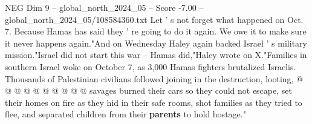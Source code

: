 \begin{textsample}{NEG Dim 9 – global\_north\_2024\_05 – Score -7.00 – global\_north\_2024\_05/108584360.txt}
Let ' s not forget what happened on Oct. 7.
Because Hamas has said they ' re going to do it again.
We owe it to make sure it never happens again."And on Wednesday Haley again backed Israel ' s military mission."Israel did not start this war -- Hamas did,"Haley wrote on X."Families in southern Israel woke on October 7, as 3,000 Hamas fighters brutalized Israelis.
Thousands of Palestinian civilians followed joining in the destruction, looting, @ @ @ @ @ @ @ @ @ @ savages burned their cars so they could not escape, set their homes on fire as they hid in their safe rooms, shot families as they tried to flee, and separated children from their \textbf{parents} to hold hostage."

\end{textsample}
